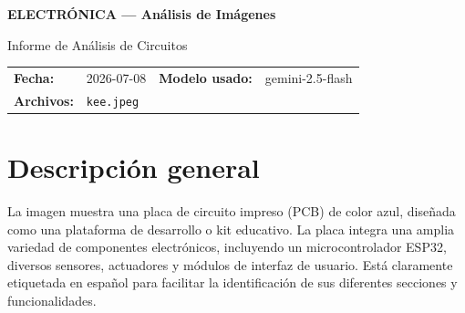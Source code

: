 \documentclass[11pt,a4paper]{article}
\newcommand{\bandaTitulo}[2]{%
  \begin{tcolorbox}[enhanced, colback=bandaAzul, colframe=bandaAzul,
    boxrule=0pt, arc=0pt, outer arc=0pt, width=\linewidth,
    halign=center, valign=center,
    top=14pt, bottom=14pt, left=10pt, right=10pt]
    {\LARGE\bfseries\color{white}#1}\par\vspace{4pt}%
    {\small\color{white!78!black}#2}%
  \end{tcolorbox}\vspace{8pt}}
\begin{document}
\bandaTitulo{ELECTRÓNICA --- Análisis de Imágenes}{Informe de Análisis de Circuitos}

\vspace{4pt}
\begin{tcolorbox}[tarjetaIcono, title={\faIcon{image} ~Datos del análisis}]
\begin{tabular}{@{}llll@{}}
  \textbf{Fecha:}       & 2026-07-08  &
  \textbf{Modelo usado:} & gemini-2.5-flash \\[4pt]
  \textbf{Archivos:}    & \multicolumn{3}{l}{\texttt{kee.jpeg}} \\
\end{tabular}
\end{tcolorbox}

\section*{Descripción general}
La imagen muestra una placa de circuito impreso (PCB) de color azul, diseñada como una plataforma de desarrollo o kit educativo. La placa integra una amplia variedad de componentes electrónicos, incluyendo un microcontrolador ESP32, diversos sensores, actuadores y módulos de interfaz de usuario. Está claramente etiquetada en español para facilitar la identificación de sus diferentes secciones y funcionalidades.

\end{document}
